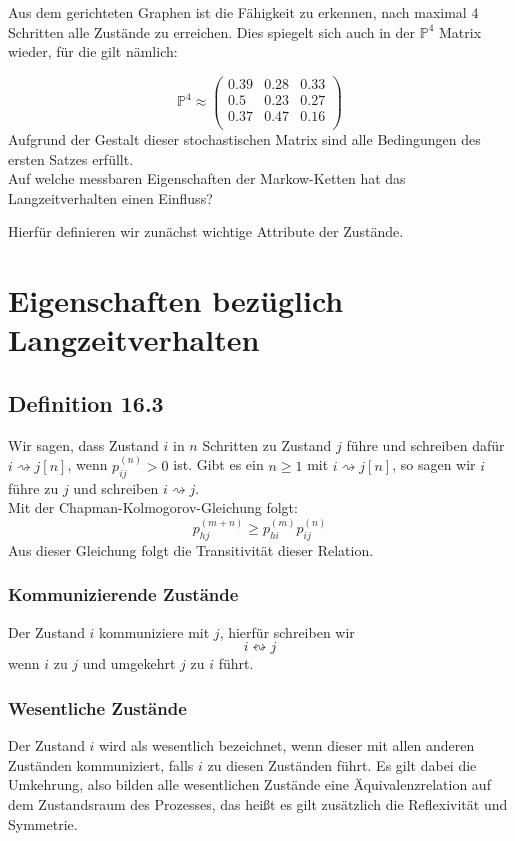 \documentclass[a4paper]{article}
\begin{document}
Aus dem gerichteten Graphen ist die Fähigkeit zu erkennen, nach maximal 4 Schritten alle Zustände
zu erreichen.
Dies spiegelt sich auch in der $\mathbb{P} ^{4}$ Matrix wieder, für die gilt nämlich:

\[
	\mathbb{P} ^{4} \approx \begin{pmatrix} 
		0.39 & 0.28 & 0.33 \\
		0.5 & 0.23 & 0.27 \\
		0.37 & 0.47 & 0.16 \\
	\end{pmatrix} 
\]
Aufgrund der Gestalt dieser stochastischen Matrix sind alle Bedingungen des ersten Satzes erfüllt.
\\

Auf welche messbaren Eigenschaften der Markow-Ketten hat das Langzeitverhalten einen Einfluss?

Hierfür definieren wir zunächst wichtige Attribute der Zustände.

\section{Eigenschaften bezüglich Langzeitverhalten}

\subsection{Definition 16.3}

Wir sagen, dass Zustand $i$ in $n$ Schritten zu Zustand $j$ führe und schreiben
dafür $i \rightsquigarrow j [n] $, wenn $p_{ij} ^{(n)} > 0$ ist.
Gibt es ein $n \geq 1$ mit $i \rightsquigarrow j [n]$, so sagen wir $i$ führe
zu $j$ und schreiben $i \rightsquigarrow j$.
\\

Mit der Chapman-Kolmogorov-Gleichung folgt:
\[
p_{hj} ^{(m+n)} \geq p_{hi} ^{(m)} p_{ij} ^{(n)}
\] 
Aus dieser Gleichung folgt die Transitivität dieser Relation.

\subsubsection{Kommunizierende Zustände}

Der Zustand $i$ kommuniziere mit $j$, hierfür schreiben wir
\[
i \leftrightsquigarrow j
\] 
wenn $i$ zu $j$ und umgekehrt $j$ zu $i$
führt.

\subsubsection{Wesentliche Zustände}
Der Zustand $i$ wird als wesentlich bezeichnet, wenn dieser mit allen anderen Zuständen
kommuniziert, falls $i$ zu diesen Zuständen führt. Es gilt dabei die Umkehrung, also bilden alle
wesentlichen Zustände eine Äquivalenzrelation auf dem Zustandsraum des Prozesses, das heißt es
gilt zusätzlich die Reflexivität und Symmetrie.
\end{document}
